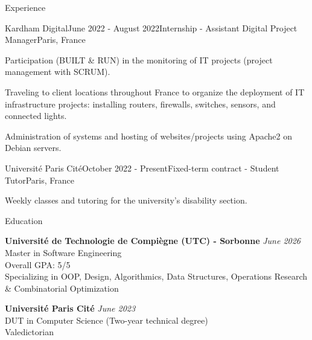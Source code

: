 \documentclass[
	10pt,
]{style} %
\begin{document}
\begin{rSection}{Experience}

	\begin{rSubsection}{Kardham Digital}{June 2022 - August 2022}{Internship - Assistant Digital Project Manager}{Paris, France}
		\item Participation (BUILT \& RUN) in the monitoring of IT projects (project management with SCRUM).
		\item Traveling to client locations throughout France to organize the deployment of IT infrastructure projects: installing routers, firewalls, switches, sensors, and connected lights.
		\item Administration of systems and hosting of websites/projects using Apache2 on Debian servers.
	\end{rSubsection}


	\begin{rSubsection}{Université Paris Cité}{October 2022 - Present}{Fixed-term contract - Student Tutor}{Paris, France}
		\item Weekly classes and tutoring for the university's disability section.
	\end{rSubsection}

\end{rSection}


\begin{rSection}{Education}

	\textbf{Université de Technologie de Compiègne (UTC) - Sorbonne} \hfill \textit{June 2026} \\
	Master in Software Engineering \\
	Overall GPA: 5/5 \\
	Specializing in OOP, Design, Algorithmics, Data Structures, Operations Research \& Combinatorial Optimization

	\textbf{Université Paris Cité} \hfill \textit{June 2023} \\
	DUT in Computer Science (Two-year technical degree) \\
	Valedictorian

\end{rSection}

\end{document}
